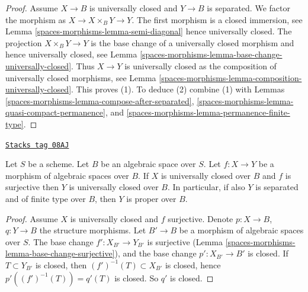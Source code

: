\begin{proof}
Assume $X \to B$ is universally closed and $Y \to B$ is separated.
We factor the morphism as $X \to X \times_B Y \to Y$.
The first morphism is a closed immersion, see
Lemma \ref{spaces-morphisms-lemma-semi-diagonal}
hence universally closed.
The projection $X \times_B Y \to Y$ is the base change
of a universally closed morphism and hence
universally closed, see
Lemma \ref{spaces-morphisms-lemma-base-change-universally-closed}.
Thus $X \to Y$ is universally closed as the composition
of universally closed morphisms, see
Lemma \ref{spaces-morphisms-lemma-composition-universally-closed}.
This proves (1). To deduce (2) combine (1) with
Lemmas \ref{spaces-morphisms-lemma-compose-after-separated},
\ref{spaces-morphisms-lemma-quasi-compact-permanence}, and
\ref{spaces-morphisms-lemma-permanence-finite-type}.
\end{proof}

\begin{lemma}
\label{spaces-morphisms-lemma-image-proper-is-proper}
\href{https://stacks.math.columbia.edu/tag/08AJ}{\texttt{Stacks tag 08AJ}}

Let $S$ be a scheme. Let $B$ be an algebraic space over $S$.
Let $f : X \to Y$ be a morphism of algebraic spaces over $B$.
If $X$ is universally closed over $B$ and $f$ is surjective then
$Y$ is universally closed over $B$. In particular, if also $Y$ is
separated and of finite type over $B$, then $Y$ is proper over $B$.
\end{lemma}

\begin{proof}
Assume $X$ is universally closed and $f$ surjective.
Denote $p : X \to B$, $q : Y \to B$ the structure morphisms.
Let $B' \to B$ be a morphism of algebraic spaces over $S$.
The base change $f' : X_{B'} \to Y_{B'}$ is surjective
(Lemma \ref{spaces-morphisms-lemma-base-change-surjective}), and the base
change $p' : X_{B'} \to B'$ is closed.
If $T \subset Y_{B'}$ is closed, then $(f')^{-1}(T) \subset X_{B'}$
is closed, hence $p'((f')^{-1}(T)) = q'(T)$ is closed.
So $q'$ is closed.
\end{proof}

